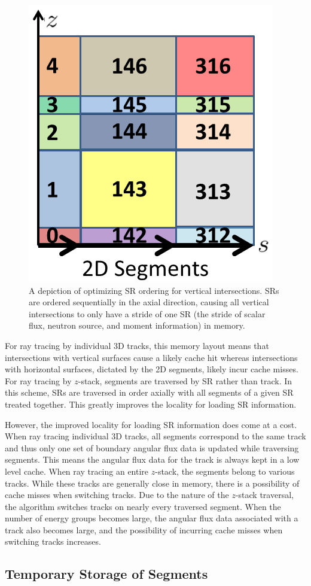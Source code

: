 \begin{figure}[ht!]
	\centering
	\includegraphics[width=0.4\linewidth]{figures/FSR_ordering_axial.PNG}
	\caption{A depiction of optimizing \ac{SR} ordering for vertical intersections. \ac{SR}s are ordered sequentially in the axial direction, causing all vertical intersections to only have a stride of one \ac{SR} (the stride of scalar flux, neutron source, and moment information) in memory.}
	\label{fig:axial-fsr-ordering}
\end{figure}

For ray tracing by individual 3D tracks, this memory layout means that intersections with vertical surfaces cause a likely cache hit whereas intersections with horizontal surfaces, dictated by the 2D segments, likely incur cache misses. For ray tracing by $z$-stack, segments are traversed by \ac{SR} rather than track. In this scheme, \ac{SR}s are traversed in order axially with all segments of a given \ac{SR} treated together. This greatly improves the locality for loading \ac{SR} information.

However, the improved locality for loading \ac{SR} information does come at a cost. When ray tracing individual 3D tracks, all segments correspond to the same track and thus only one set of boundary angular flux data is updated while traversing segments. This means the angular flux data for the track is always kept in a low level cache. When ray tracing an entire $z$-stack, the segments belong to various tracks. While these tracks are generally close in memory, there is a possibility of cache misses when switching tracks. Due to the nature of the $z$-stack traversal, the algorithm switches tracks on nearly every traversed segment. When the number of energy groups becomes large, the angular flux data associated with a track also becomes large, and the possibility of incurring cache misses when switching tracks increases.

\subsection{Temporary Storage of Segments}

